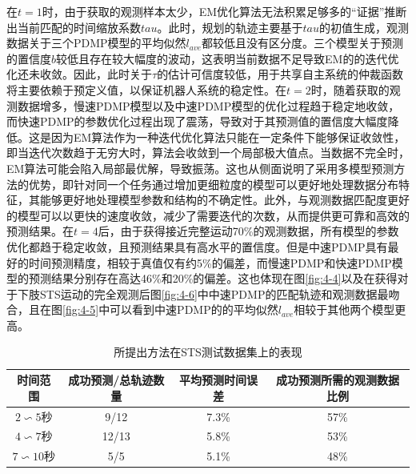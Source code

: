 在$t=1$时，由于获取的观测样本太少，EM优化算法无法积累足够多的``证据''推断出当前匹配的时间缩放系数$tau$。此时，规划的轨迹主要基于$tau$的初值生成，观测数据关于三个PDMP模型的平均似然$l_{ave}$都较低且没有区分度。三个模型关于预测的置信度$b$较低且存在较大幅度的波动，这表明当前数据不足导致EM的的迭代优化还未收敛。因此，此时关于$\tau$的估计可信度较低，用于共享自主系统的仲裁函数将主要依赖于预定义值，以保证机器人系统的稳定性。在$t=2$时，随着获取的观测数据增多，慢速PDMP模型以及中速PDMP模型的优化过程趋于稳定地收敛，而快速PDMP的参数优化过程出现了震荡，导致对于其预测值的置信度大幅度降低。这是因为EM算法作为一种迭代优化算法只能在一定条件下能够保证收敛性，即当迭代次数趋于无穷大时，算法会收敛到一个局部极大值点。当数据不完全时，EM算法可能会陷入局部最优解，导致振荡。这也从侧面说明了采用多模型预测方法的优势，即针对同一个任务通过增加更细粒度的模型可以更好地处理数据分布特征，其能够更好地处理模型参数和结构的不确定性。此外，与观测数据匹配度更好的模型可以以更快的速度收敛，减少了需要迭代的次数，从而提供更可靠和高效的预测结果。在$t=4$后，由于获得接近完整运动70\%的观测数据，所有模型的参数优化都趋于稳定收敛，且预测结果具有高水平的置信度。但是中速PDMP具有最好的时间预测精度，相较于真值仅有约5\%的偏差，而慢速PDMP和快速PDMP模型的预测结果分别存在高达46\%和20\%的偏差。这也体现在图\ref{fig:4-4}以及在获得对于下肢STS运动的完全观测后图\ref{fig:4-6}中中速PDMP的匹配轨迹和观测数据最吻合，且在图\ref{fig:4-5}中可以看到中速PDMP的的平均似然$l_{ave}$相较于其他两个模型更高。
\begin{table}[htb]
    \centering
    \caption{所提出方法在STS测试数据集上的表现}
    \setlength{\tabcolsep}{5pt}
    \begin{tabular}{c c c c}
    \hline\hline
     时间范围 & 成功预测/总轨迹数量 & 平均预测时间误差 & 成功预测所需的观测数据比例\\  
    \hline
    $2\backsim 5$秒& 9/12 & 7.3\%& 57\%\\ 
    $4\backsim 7$秒& 12/13 & 5.8\%& 53\%\\ 
    $7\backsim 10$秒& 5/5 & 5.1\%& 48\%\\ 
    \hline\hline
    \end{tabular}
    \label{tab:4-1}
\end{table}    


